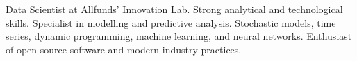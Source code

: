 

\begin{cvparagraph}

Data Scientist at Allfunds' Innovation Lab. Strong analytical and technological
skills. Specialist in modelling and predictive analysis. Stochastic models, time
series, dynamic programming, machine learning, and neural networks. Enthusiast of
open source software and modern industry practices.

\end{cvparagraph}
